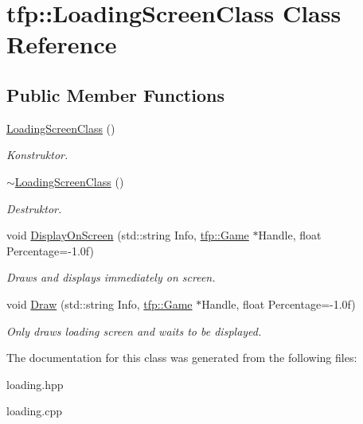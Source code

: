 \hypertarget{classtfp_1_1_loading_screen_class}{}\section{tfp\+:\+:Loading\+Screen\+Class Class Reference}
\label{classtfp_1_1_loading_screen_class}
\subsection*{Public Member Functions}
\begin{DoxyCompactItemize}
\item 
\mbox{\label{classtfp_1_1_loading_screen_class_a97625df51c101b9917612496e03c6244}} 
\mbox{\hyperlink{classtfp_1_1_loading_screen_class_a97625df51c101b9917612496e03c6244}{Loading\+Screen\+Class}} ()
\begin{DoxyCompactList}\small\item\em Konstruktor. \end{DoxyCompactList}\item 
\mbox{\label{classtfp_1_1_loading_screen_class_adcd4b6cf24b389325575e1293a28d5d0}} 
\mbox{\hyperlink{classtfp_1_1_loading_screen_class_adcd4b6cf24b389325575e1293a28d5d0}{$\sim$\+Loading\+Screen\+Class}} ()
\begin{DoxyCompactList}\small\item\em Destruktor. \end{DoxyCompactList}\item 
\mbox{\label{classtfp_1_1_loading_screen_class_a133208c517620d353260e33c9e48fa0e}} 
void \mbox{\hyperlink{classtfp_1_1_loading_screen_class_a133208c517620d353260e33c9e48fa0e}{Display\+On\+Screen}} (std\+::string Info, \mbox{\hyperlink{classtfp_1_1_game}{tfp\+::\+Game}} $\ast$Handle, float Percentage=-\/1.\+0f)
\begin{DoxyCompactList}\small\item\em Draws and displays immediately on screen. \end{DoxyCompactList}\item 
\mbox{\label{classtfp_1_1_loading_screen_class_a43948110afc4353490b367156fdc3be8}} 
void \mbox{\hyperlink{classtfp_1_1_loading_screen_class_a43948110afc4353490b367156fdc3be8}{Draw}} (std\+::string Info, \mbox{\hyperlink{classtfp_1_1_game}{tfp\+::\+Game}} $\ast$Handle, float Percentage=-\/1.\+0f)
\begin{DoxyCompactList}\small\item\em Only draws loading screen and waits to be displayed. \end{DoxyCompactList}\end{DoxyCompactItemize}


The documentation for this class was generated from the following files\+:\begin{DoxyCompactItemize}
\item 
loading.\+hpp\item 
loading.\+cpp\end{DoxyCompactItemize}
